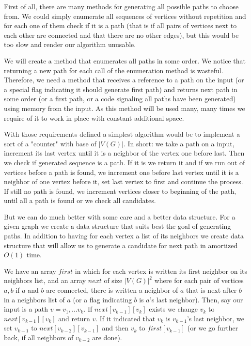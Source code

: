 First of all, there are many methods for generating all possible paths to choose from. We could simply enumerate all sequences of vertices without repetition and for each one of them check if it is a path (that is if all pairs of vertices next to each other are connected and that there are no other edges), but this would be too slow and render our algorithm unusable.

We will create a method that enumerates all paths in some order. We notice that returning a new path for each call of the enumeration method is wasteful. Therefore, we need a method that receives a reference to a path on the input (or a special flag indicating it should generate first path) and returns next path in some order (or a first path, or a code signaling all paths have been generated) using memory from the input. As this method will be used many, many times we require of it to work in place with constant additional space.

With those requirements defined a simplest algorithm would be to implement a sort of a "counter" with base of $|V(G)|$. In short: we take a path on a input, increment its last vertex until it is a neighbor of the vertex one before last. Then we check if generated sequence is a path. If it is we return it and if we run out of vertices before a path is found, we increment one before last vertex until it is a neighbor of one vertex before it, set last vertex to first and continue the process. If still no path is found, we increment vertices closer to beginning of the path, until all a path is found or we check all candidates.

But we can do much better with some care and a better data structure. For a given graph we create a data structure that suits best the goal of generating paths. In addition to having for each vertex a list of its neighbors we create data structure that will allow us to generate a candidate for next path in amortized $O(1)$ time.

We have an array $first$ in which for each vertex is written its first neighbor on its neighbors list, and an array $next$ of size $|V(G)|^2$ where for each pair of vertices $a, b$ if $a$ and $b$ are connected, there is written a neighbor of $a$ that is next after $b$ in a neighbors list of $a$ (or a flag indicating $b$ is $a$'s last neighbor). Then, say our input is a path $v = v_1, \ldots v_k$. If $next[v_{k-1}][v_k]$ exists we change $v_k$ to $next[v_{k-1}][v_k]$ and return $v$. If it indicated that $v_k$ is $v_{k-1}$'s last neighbor, we set $v_{k-1}$ to $next[v_{k-2}][v_{k-1}]$ and then $v_k$ to $first[v_{k-1}]$ (or we go further back, if all neighbors of $v_{k-2}$ are done).

